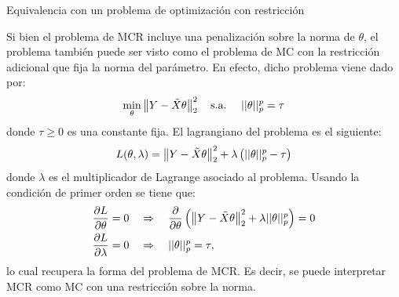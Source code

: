 \documentclass[9pt]{beamer}
\begin{document}
\begin{frame}{Equivalencia con un problema de optimización con restricción}

Si bien el problema de MCR incluye una penalización sobre la norma de $\theta$, el problema también puede ser visto como el problema de MC con la restricción adicional que fija la norma del parámetro. \pause En efecto, dicho problema viene dado por:
\begin{align*}
	\min_\theta  \left\lVert Y-\tilde{X}\theta\right\rVert_2^2\label{eq:dual_MCR1}
	\quad\text{s.a.} \quad \ ||\theta||_p^p = \tau
\end{align*}
donde $\tau\geq0$ es una constante fija. \pause El lagrangiano del problema es el siguiente:
\begin{equation*}
	L(\theta,\lambda) = \left\lVert Y-\tilde{X}\theta\right\rVert_2^2 + \lambda \left(||\theta||_p^p - \tau\right)
\end{equation*}
donde $\lambda$ es el multiplicador de Lagrange asociado al problema. \pause Usando la condición de primer orden se tiene que: 
\begin{align*}
	\frac{\partial L}{\partial \theta} = 0 &\quad\Rightarrow\quad  \frac{\partial }{\partial \theta}\left(\left\lVert Y-\tilde{X}\theta\right\rVert_2^2 + \lambda ||\theta||_p^p \right) = 0\\
	\frac{\partial L}{\partial \lambda} = 0 &\quad\Rightarrow\quad ||\theta||_p^p = \tau,
\end{align*}\pause
lo cual recupera la forma del problema de MCR. Es decir, se puede interpretar MCR como MC con una restricción sobre la norma.

\end{frame}
\end{document}
